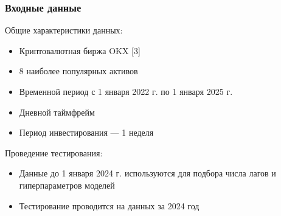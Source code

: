 \documentclass{beamer}
\begin{document}
\begin{frame}
    \frametitle{Входные данные}
    Общие характеристики данных:
    \begin{itemize}
        \item Криптовалютная биржа OKX [3]
        \item 8 наиболее популярных активов
        \item Временной период с 1 января 2022 г. по 1 января 2025 г.
        \item Дневной таймфрейм
        \item Период инвестирования --- 1 неделя
    \end{itemize}

    Проведение тестирования:
    \begin{itemize}
        \item Данные до 1 января 2024 г. используются для подбора числа лагов и 
        гиперпараметров моделей
        \item Тестирование проводится на данных за 2024 год
    \end{itemize}
\end{frame}
\end{document}
